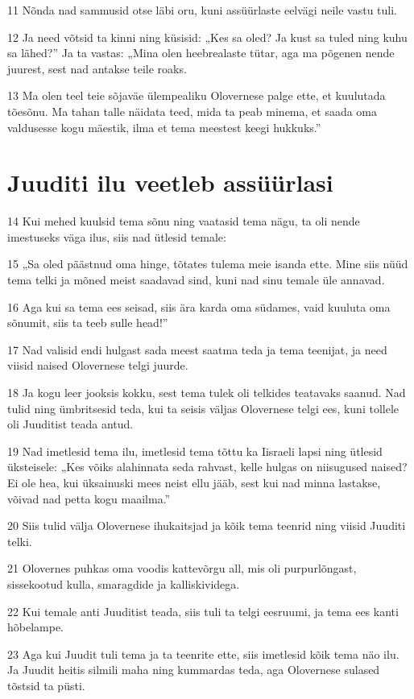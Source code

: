 \par 11 Nõnda nad sammusid otse läbi oru, kuni assüürlaste eelvägi neile vastu tuli.
\par 12 Ja need võtsid ta kinni ning küsisid: „Kes sa oled? Ja kust sa tuled ning kuhu sa lähed?” Ja ta vastas: „Mina olen heebrealaste tütar, aga ma põgenen nende juurest, sest nad antakse teile roaks.
\par 13 Ma olen teel teie sõjaväe ülempealiku Olovernese palge ette, et kuulutada tõesõnu. Ma tahan talle näidata teed, mida ta peab minema, et saada oma valdusesse kogu mäestik, ilma et tema meestest keegi hukkuks.”

\section*{Juuditi ilu veetleb assüürlasi}

\par 14 Kui mehed kuulsid tema sõnu ning vaatasid tema nägu, ta oli nende imestuseks väga ilus, siis nad ütlesid temale:
\par 15 „Sa oled päästnud oma hinge, tõtates tulema meie isanda ette. Mine siis nüüd tema telki ja mõned meist saadavad sind, kuni nad sinu temale üle annavad.
\par 16 Aga kui sa tema ees seisad, siis ära karda oma südames, vaid kuuluta oma sõnumit, siis ta teeb sulle head!”
\par 17 Nad valisid endi hulgast sada meest saatma teda ja tema teenijat, ja need viisid naised Olovernese telgi juurde.
\par 18 Ja kogu leer jooksis kokku, sest tema tulek oli telkides teatavaks saanud. Nad tulid ning ümbritsesid teda, kui ta seisis väljas Olovernese telgi ees, kuni tollele oli Juuditist teada antud.
\par 19 Nad imetlesid tema ilu, imetlesid tema tõttu ka Iisraeli lapsi ning ütlesid üksteisele: „Kes võiks alahinnata seda rahvast, kelle hulgas on niisugused naised? Ei ole hea, kui üksainuski mees neist ellu jääb, sest kui nad minna lastakse, võivad nad petta kogu maailma.”
\par 20 Siis tulid välja Olovernese ihukaitsjad ja kõik tema teenrid ning viisid Juuditi telki.
\par 21 Olovernes puhkas oma voodis kattevõrgu all, mis oli purpurlõngast, sissekootud kulla, smaragdide ja kalliskividega.
\par 22 Kui temale anti Juuditist teada, siis tuli ta telgi eesruumi, ja tema ees kanti hõbelampe.
\par 23 Aga kui Juudit tuli tema ja ta teenrite ette, siis imetlesid kõik tema näo ilu. Ja Juudit heitis silmili maha ning kummardas teda, aga Olovernese sulased tõstsid ta püsti.


